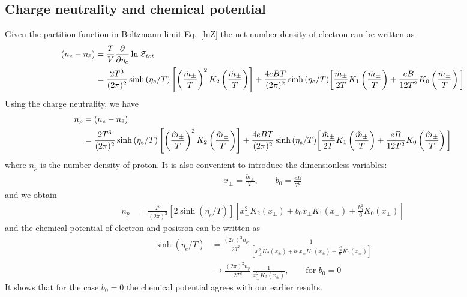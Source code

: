 \documentclass[Universe,article,submit,moreauthors,pdftex]{Definitions/mdpi}
\newcommand*{\req}[1]{Eq.~{\eqref{#1}}}
\begin{document}
\subsection{Charge neutrality and chemical potential}
Given the partition function in Boltzmann limit \req{lnZ} the net number density of electron can be written as
\begin{align}
\left(n_e-n_{\bar e}\right)&=\frac{T}{V}\frac{\partial}{\partial \eta_{e}}\ln\mathcal{Z}_{tot}\notag\\
&=\frac{2T^3}{(2\pi)^2}\sinh{(\eta_{e}/T)}\left[\left(\frac{\tilde{m}_\pm}{T}\right)^2K_2\left(\frac{\tilde{m}_{\pm}}{T}\right)\right]+\frac{4eBT}{(2\pi)^2}\sinh{(\eta_{e}/T)}\bigg[\frac{\tilde{m}_\pm}{2T}K_1\left(\frac{\tilde{m}_{\pm}}{T}\right)+\frac{eB}{12T^2}K_0\left(\frac{\tilde{m}_{\pm}}{T}\right)\bigg]
\end{align}
Using the charge neutrality, we have
\begin{align}
n_p&=\left(n_e-n_{\bar e}\right)\notag\\
&=\frac{2T^3}{(2\pi)^2}\sinh{(\eta_{e}/T)}\left[\left(\frac{\tilde{m}_\pm}{T}\right)^2K_2\left(\frac{\tilde{m}_{\pm}}{T}\right)\right]
+\frac{4eBT}{(2\pi)^2}\sinh{(\eta_{e}/T)}\bigg[\frac{\tilde{m}_\pm}{2T}K_1\left(\frac{\tilde{m}_{\pm}}{T}\right)+\frac{eB}{12T^2}K_0\left(\frac{\tilde{m}_{\pm}}{T}\right)\bigg]
\end{align}
where $n_p$ is the number density of proton. It is also convenient to introduce the dimensionless variables:
\begin{align}
x_\pm=\frac{\tilde m_\pm}{T},\qquad b_0=\frac{eB}{T^2}
\end{align}
and we obtain
\begin{align}
n_p&=\frac{T^3}{(2\pi)^2}\left[2\sinh{(\eta_{e}/T)}\right]\left[x_\pm^2K_2(x_\pm)+b_0x_\pm K_1(x_\pm)+\frac{b^2_0}{6}K_0(x_\pm)\right]
\end{align}
and the chemical potential of electron and positron can be written as
\begin{align}\label{ChemicalPotential}
\sinh{(\eta_{e}/T)}&=\frac{(2\pi)^2n_p}{2T^3}\,\frac{1}{\left[x_\pm^2K_2(x_\pm)+b_0x_\pm K_1(x_\pm)+\frac{b^2_0}{6}K_0(x_\pm)\right]}\\
&\longrightarrow\frac{(2\pi)^2n_p}{2T^3}\,\frac{1}{x_\pm^2K_2(x_\pm)},\qquad \mathrm{for}\,\,b_0=0
\end{align}
It shows that for the case $b_0=0$ the chemical potential agrees with our earlier results.
\end{document}
